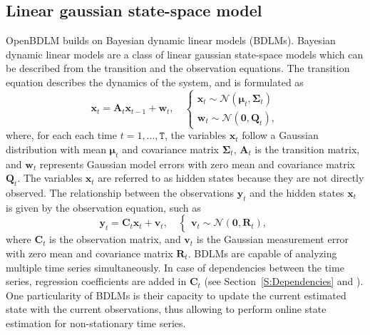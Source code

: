 \subsection{Linear gaussian state-space model}
\label{SS:LGSSM}
OpenBDLM builds on Bayesian dynamic linear models (BDLMs).
Bayesian dynamic linear models \cite{west1999bayesian} are a class of linear gaussian state-space models which can be described from the transition and the observation equations.
The transition equation describes the dynamics of the system, and is formulated as
\begin{equation}
  \mathbf{x}_{t}=\mathbf{A}_{t}\mathbf{x}_{t-1}+\mathbf{w}_{t},\quad\left\{
  \begin{array}{l}
\mathbf{x}_{t}\sim \mathcal{N}(\bm{\mu}_{t},\bm{\Sigma}_{t})\\[4pt]
\mathbf{w}_{t}\sim \mathcal{N}(\mathbf{0},
\mathbf{Q}_{t}),
\end{array}\right.
\label{EQ:SSM_Transition}
\end{equation}
where, for each each time $t=1, \dots ,\mathtt{T}$, the variables $\mathbf{x}_{t}$ follow a Gaussian distribution with mean $\bm{\mu}_{t}$ and covariance matrix $\bm{\Sigma}_{t}$, $\mathbf{A}_{t}$ is the transition matrix, and $\mathbf{w}_{t}$ represents Gaussian model errors with zero mean and covariance matrix $\mathbf{Q}_{t}$.
The variables $\mathbf{x}_{t}$ are referred to as hidden states because they are not directly observed.
The relationship between the observations $\mathbf{y}_{t}$ and the hidden states $\mathbf{x}_{t}$ is given by the observation equation, such as
\begin{equation}
\mathbf{y}_{t}=\mathbf{C}_{t}\mathbf{x}_{t}+\mathbf{v}_{t},\quad\left\{\begin{array}{l}
\mathbf{v}_{t}\sim \mathcal{N}(\mathbf{0},\mathbf{R}_{t}),
\end{array}\right.
\label{EQ:SSM_Observation}
\end{equation}
where $\mathbf{C}_{t}$ is the observation matrix, and $\mathbf{v}_{t}$ is the Gaussian measurement error with zero mean and covariance matrix $\mathbf{R}_{t}$.
BDLMs are capable of analyzing multiple time series simultaneously.
In case of dependencies between the time series, regression coefficients are added in $\mathbf{C}_{t}$ (see Section~\ref{S:Dependencies} and \cite{STC:STC2035}).
One particularity of BDLMs is their capacity to update the current estimated state with the current observations, thus allowing to perform online state estimation for non-stationary time series.

